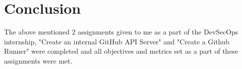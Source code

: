 
\chapter{Conclusion} %

\label{Chapter 5} %


The above mentioned 2 assignments given to me as a part of the DevSecOps internship, "Create an internal GitHub API Server" and "Create a Github Runner" were completed and all objectives and metrics set as a part of these assignments were met.